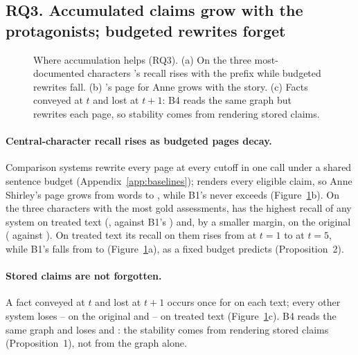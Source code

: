 \subsection{RQ3. Accumulated claims grow with the protagonists; budgeted rewrites forget}
\label{sec:results-gains}

\begin{figure}[t]
\centering
\resizebox{\textwidth}{!}{}
\caption{Where accumulation helps (RQ3). (a) On the three most-documented characters \sys's
recall rises with the prefix while budgeted rewrites fall. (b) \sys's page for Anne grows
with the story. (c) Facts conveyed at $t$ and lost at $t+1$: B4 reads the same graph but
rewrites each page, so stability comes from rendering stored claims.}
\label{fig:accumulation}
\end{figure}

\paragraph{Central-character recall rises as budgeted pages decay.}
Comparison systems rewrite every page at every cutoff in one call under a shared sentence
budget (Appendix~\ref{app:baselines}); \sys renders every eligible claim, so Anne Shirley's
page grows from  words to , while B1's never exceeds
 (Figure~\ref{fig:accumulation}b). On the three characters with the most gold assessments, \sys has the highest recall of any
system on treated text (, against B1's )
and, by a smaller margin, on the original ( against
). On treated text its recall on them rises from
 at $t=1$ to  at $t=5$, while B1's falls
from  to  (Figure~\ref{fig:accumulation}a),
as a fixed budget predicts (Proposition~2).

\paragraph{Stored claims are not forgotten.}
A fact conveyed at $t$ and lost at $t+1$ occurs once for \sys on each text; every other
system loses -- on the original and
-- on treated text
(Figure~\ref{fig:accumulation}c). B4 reads the same graph and loses  and
: the stability comes from rendering stored claims (Proposition~1),
not from the graph alone.

